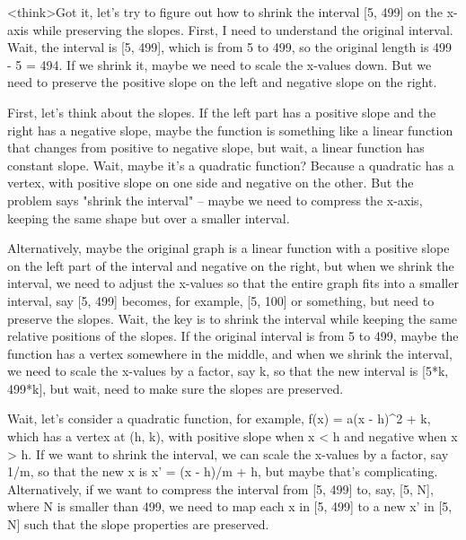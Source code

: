 <think>Got it, let's try to figure out how to shrink the interval [5, 499] on the x-axis while preserving the slopes. First, I need to understand the original interval. Wait, the interval is [5, 499], which is from 5 to 499, so the original length is 499 - 5 = 494. If we shrink it, maybe we need to scale the x-values down. But we need to preserve the positive slope on the left and negative slope on the right. 

First, let's think about the slopes. If the left part has a positive slope and the right has a negative slope, maybe the function is something like a linear function that changes from positive to negative slope, but wait, a linear function has constant slope. Wait, maybe it's a quadratic function? Because a quadratic has a vertex, with positive slope on one side and negative on the other. But the problem says "shrink the interval" – maybe we need to compress the x-axis, keeping the same shape but over a smaller interval. 

Alternatively, maybe the original graph is a linear function with a positive slope on the left part of the interval and negative on the right, but when we shrink the interval, we need to adjust the x-values so that the entire graph fits into a smaller interval, say [5, 499] becomes, for example, [5, 100] or something, but need to preserve the slopes. Wait, the key is to shrink the interval while keeping the same relative positions of the slopes. If the original interval is from 5 to 499, maybe the function has a vertex somewhere in the middle, and when we shrink the interval, we need to scale the x-values by a factor, say k, so that the new interval is [5*k, 499*k], but wait, need to make sure the slopes are preserved. 

Wait, let's consider a quadratic function, for example, f(x) = a(x - h)^2 + k, which has a vertex at (h, k), with positive slope when x < h and negative when x > h. If we want to shrink the interval, we can scale the x-values by a factor, say 1/m, so that the new x is x' = (x - h)/m + h, but maybe that's complicating. Alternatively, if we want to compress the interval from [5, 499] to, say, [5, N], where N is smaller than 499, we need to map each x in [5, 499] to a new x' in [5, N] such that the slope properties are preserved. 

